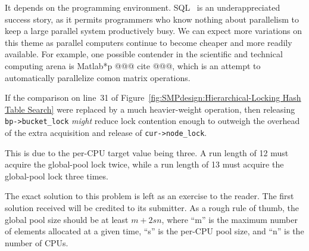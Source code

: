 
	   It depends on the programming environment.
	   SQL~\cite{DIS9075SQL92} is an underappreciated success
	   story, as it permits programmers who know nothing about parallelism
	   to keep a large parallel system productively busy.
	   We can expect more variations on this theme as parallel
	   computers continue to become cheaper and more readily available.
	   For example, one possible contender in the scientific and
	   technical computing arena is Matlab*p @@@ cite @@@,
	   which is an attempt to automatically parallelize comon
	   matrix operations.


	If the comparison on line~31 of
	Figure~\ref{fig:SMPdesign:Hierarchical-Locking Hash Table Search}
	were replaced by a much heavier-weight operation,
	then releasing {\tt bp->bucket\_lock} \emph{might} reduce lock
	contention enough to outweigh the overhead of the extra
	acquisition and release of {\tt cur->node\_lock}.


	This is due to the per-CPU target value being three.
	A run length of 12 must acquire the global-pool lock twice,
	while a run length of 13 must acquire the global-pool lock
	three times.


	The exact solution to this problem is left as an exercise to
	the reader.
	The first solution received will be credited to its submitter.
	As a rough rule of thumb, the global pool size should be at least
	$m+2sn$, where
	``m'' is the maximum number of elements allocated at a given time,
	``s'' is the per-CPU pool size,
	and ``n'' is the number of CPUs.


